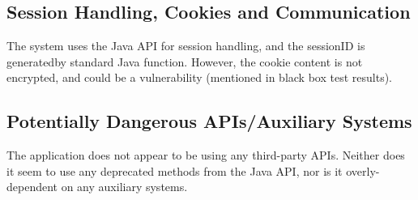\subsection{Session Handling, Cookies and Communication}
The system uses the Java API for session handling, and the sessionID is generatedby standard Java function. However, the cookie content is not encrypted, and could be a vulnerability (mentioned in black box test results).


\subsection{Potentially Dangerous APIs/Auxiliary Systems}
The application does not appear to be using any third-party APIs. Neither does it seem to use any deprecated methods from the Java API, nor is it overly-dependent on any auxiliary systems.

